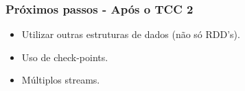 \documentclass{beamer}
\begin{document}
  \begin{frame}
      \frametitle{Próximos passos - Após o TCC 2}
      \begin{itemize}
          \item Utilizar outras estruturas de dados (não só RDD's).
          \item Uso de check-points.
          \item Múltiplos streams.
      \end{itemize}
  \end{frame}
\end{document}
